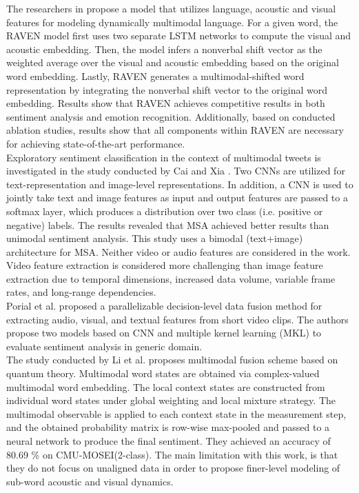 The researchers in \cite{Wang2018} propose a model that utilizes language, acoustic and visual features for modeling dynamically multimodal language. For a given word, the RAVEN model first uses two separate LSTM networks to compute the visual and acoustic embedding. Then, the model infers a nonverbal shift vector as the weighted average  over the visual and acoustic embedding based on the original word embedding. Lastly, RAVEN generates a  multimodal-shifted word representation by integrating the nonverbal shift vector to the original word embedding. Results show that RAVEN achieves competitive results in both sentiment analysis and emotion recognition. Additionally, based on conducted ablation studies, results show that all components within RAVEN are necessary for achieving state-of-the-art performance. \\

Exploratory sentiment classification in the context of multimodal tweets is investigated in the study conducted by Cai and Xia \cite{late_fusion_cai2015convolutional}. Two CNNs are utilized for text-representation and image-level representations. In addition, a CNN is used to jointly take text and image features as input and output features are passed to a softmax layer, which produces a distribution over two class (i.e. positive or negative) labels. The results revealed that MSA achieved better results than unimodal sentiment analysis. This study uses a bimodal (text+image) architecture for MSA. Neither video or audio features are considered in the work. Video feature extraction is considered more challenging than image feature extraction due to temporal dimensions, increased data volume, variable frame rates, and long-range dependencies. \\

Porial et al. \cite{hybrid_fusion_poria2015deep} proposed a parallelizable decision-level data fusion method for extracting audio, visual, and textual features from short video clips. The authors propose two models based on CNN and multiple kernel learning (MKL) to evaluate sentiment analysis in generic domain.  \\

The study conducted by Li et al. \cite{quantum_based_fusion_LI202158} proposes multimodal fusion scheme based on quantum theory. Multimodal word states are obtained via complex-valued multimodal word embedding. The local context states are constructed from individual word states under global weighting and local mixture strategy. The multimodal observable is applied to each context state in the measurement step, and the obtained probability matrix is row-wise max-pooled and passed to a neural network to produce the final sentiment. They achieved an accuracy of 80.69 \% on CMU-MOSEI(2-class). The main limitation with this work, is that they do not focus on unaligned data in order to propose finer-level modeling of sub-word acoustic
and visual dynamics. \\

